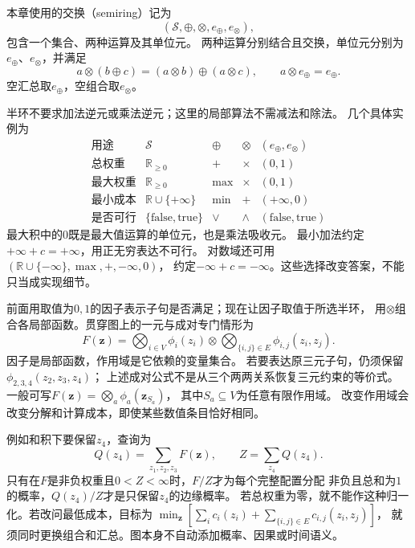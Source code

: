 \begin{definition}[交换半环]
  \label{def:graph-theory-semiring}
  本章使用的交换（semiring）记为
  \[
    (\mathcal S,\oplus,\otimes,e_{\oplus},e_{\otimes}),
  \]
  包含一个集合、两种运算及其单位元。
  两种运算分别结合且交换，单位元分别为\(e_{\oplus}\)、\(e_{\otimes}\)，并满足
  \[
    a\otimes(b\oplus c)=(a\otimes b)\oplus(a\otimes c),\qquad
    a\otimes e_{\oplus}=e_{\oplus}.
  \]
  空汇总取\(e_{\oplus}\)，空组合取\(e_{\otimes}\)。
\end{definition}

半环不要求加法逆元或乘法逆元；这里的局部算法不需减法和除法。
几个具体实例为
\[
  \begin{array}{c|c|c|c|c}
    \text{用途}&\mathcal S&\oplus&\otimes&(e_{\oplus},e_{\otimes})\\ \hline
    \text{总权重}&\mathbb R_{\geq0}&+&\times&(0,1)\\
    \text{最大权重}&\mathbb R_{\geq0}&\max&\times&(0,1)\\
    \text{最小成本}&\mathbb R\cup\{+\infty\}&\min&+&(+\infty,0)\\
    \text{是否可行}&\{\mathrm{false},\mathrm{true}\}&\lor&\land&
       (\mathrm{false},\mathrm{true})
  \end{array}
\]
最大积中的\(0\)既是最大值运算的单位元，也是乘法吸收元。
最小加法约定\(+\infty+c=+\infty\)，用正无穷表达不可行。
对数域还可用\((\mathbb R\cup\{-\infty\},\max,+,-\infty,0)\)，
约定\(-\infty+c=-\infty\)。这些选择改变答案，不能只当成实现细节。

前面用取值为\(0,1\)的因子表示子句是否满足；现在让因子取值于所选半环，
用\(\otimes\)组合各局部函数。贯穿图上的一元与成对专门情形为
\begin{equation}
  F(\bm z)=\bigotimes_{i\in V}\phi_i(z_i)
    \otimes\bigotimes_{\{i,j\}\in E}\phi_{i,j}(z_i,z_j).
  \label{eq:graph-theory-factorized-objective}
\end{equation}
因子是局部函数，作用域是它依赖的变量集合。
若要表达原三元子句，仍须保留\(\phi_{2,3,4}(z_2,z_3,z_4)\)；
上述成对公式不是从三个两两关系恢复三元约束的等价式。
一般可写\(F(\bm z)=\bigotimes_a\phi_a(\bm z_{S_a})\)，
其中\(S_a\subseteq V\)为任意有限作用域。
改变作用域会改变分解和计算成本，即使某些数值条目恰好相同。

例如和积下要保留\(z_4\)，查询为
\[
  Q(z_4)=\sum_{z_1,z_2,z_3}F(\bm z),\qquad
  Z=\sum_{z_4}Q(z_4).
\]
只有在\(F\)是非负权重且\(0<Z<\infty\)时，\(F/Z\)才为每个完整配置分配
非负且总和为\(1\)的概率，\(Q(z_4)/Z\)才是只保留\(z_4\)的边缘概率。
若总权重为零，就不能作这种归一化。若改问最低成本，目标为
\(\min_{\bm z}[\sum_i c_i(z_i)+\sum_{\{i,j\}\in E}c_{i,j}(z_i,z_j)]\)，
就须同时更换组合和汇总。图本身不自动添加概率、因果或时间语义。

